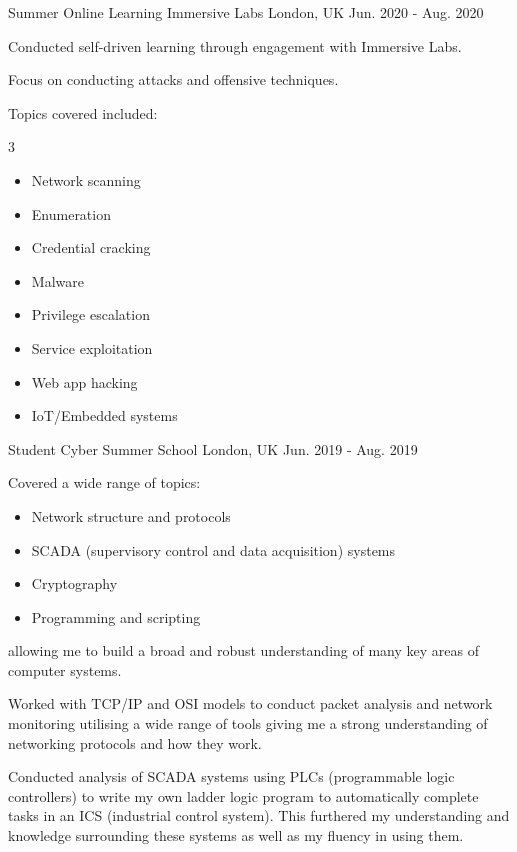 \begin{cventries}
\cventry
{Summer Online Learning} %
{Immersive Labs} %
{London, UK} %
{Jun. 2020 - Aug. 2020} %
{ %
\begin{cvitems}
\item {Conducted self-driven learning through engagement with Immersive Labs.}
\item {Focus on conducting attacks and offensive techniques.}
\item {Topics covered included:}
\begin{multicols}{3}
\begin{itemize}
    \item Network scanning
    \item Enumeration
    \item Credential cracking
    \item Malware
    \item Privilege escalation
    \item Service exploitation
    \item Web app hacking
    \item IoT/Embedded systems
\end{itemize}
\end{multicols}
\end{cvitems}
}

\cventry
{Student} %
{Cyber Summer School} %
{London, UK} %
{Jun. 2019 - Aug. 2019} %
{ %
\begin{cvitems}
\item {Covered a wide range of topics: 
\begin{itemize}
    \item Network structure and protocols
    \item SCADA (supervisory control and data acquisition) systems
    \item Cryptography
    \item Programming and scripting
\end{itemize} 
allowing me to build a broad and robust understanding of many key areas of computer systems.}
\item {Worked with TCP/IP and OSI models to conduct packet analysis and network monitoring utilising a wide range of tools giving me a strong understanding of networking protocols and how they work.}
\item {Conducted analysis of SCADA systems using PLCs (programmable logic controllers) to write my own ladder logic program to automatically complete tasks in an ICS (industrial control system). This furthered my understanding and knowledge surrounding these systems as well as my fluency in using them.}
\end{cvitems}
}


\end{cventries}
